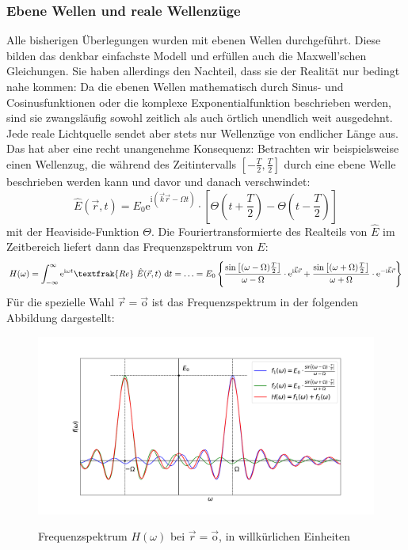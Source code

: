 \documentclass[german,  %
parskip=full,  %
]{scrartcl}
\begin{document}
\subsubsection{Ebene Wellen und reale Wellenzüge}
Alle bisherigen Überlegungen wurden mit ebenen Wellen durchgeführt. Diese bilden das denkbar einfachste Modell und erfüllen auch die Maxwell'schen Gleichungen. Sie haben allerdings den Nachteil, dass sie der Realität nur bedingt nahe kommen: Da die ebenen Wellen mathematisch durch Sinus- und Cosinusfunktionen oder die komplexe Exponentialfunktion beschrieben werden, sind sie zwangsläufig sowohl zeitlich als auch örtlich unendlich weit ausgedehnt. Jede reale Lichtquelle sendet aber stets nur Wellenzüge von endlicher Länge aus. Das hat aber eine recht unangenehme Konsequenz: Betrachten wir beispielsweise einen Wellenzug, die während des Zeitintervalls \(\left[-\frac{T}{2},\frac{T}{2}\right]\) durch eine ebene Welle beschrieben werden kann und davor und danach verschwindet:
\[\hat{E}(\vec{r},t) = E_0 \mathrm{e}^{\mathrm{i}(\vec{k}\vec{r} - \Omega t)} \cdot\left[\Theta\left(t+\frac{T}{2}\right) - \Theta\left(t-\frac{T}{2}\right)\right]\]
mit der Heaviside-Funktion \(\Theta\). Die Fouriertransformierte des Realteils von \(\hat{E}\) im Zeitbereich liefert dann das Frequenzspektrum von \(E\):
\begin{align*}
H(\omega) = \int_{-\infty}^{\infty} \mathrm{e}^{\mathrm{i}\omega t}\textfrak{Re} \ \hat{E}(\vec{r},t) \ \mathrm{d} t = \hdots = E_0 \left\lbrace   \frac{\sin\left[(\omega - \Omega)\frac{T}{2}\right]}{\omega - \Omega} \cdot \mathrm{e}^{\mathrm{i}\vec{k}\vec{r}} +  \frac{\sin\left[(\omega + \Omega)\frac{T}{2}\right]}{\omega + \Omega} \cdot \mathrm{e}^{-\mathrm{i}\vec{k}\vec{r}}\right\rbrace
\end{align*}
Für die spezielle Wahl \(\vec{r} = \vec{\mathrm{o}}\) ist das Frequenzspektrum in der folgenden Abbildung dargestellt:
\begin{figure}[h!]\centering
\includegraphics[scale=0.4]{Frequenzspektrum.png}
\label{Frequenzspqktrum}
\caption{Frequenzspektrum \(H(\omega)\) bei \(\vec{r} = \vec{\mathrm{o}}\), in willkürlichen Einheiten}
\end{figure}
\end{document}
